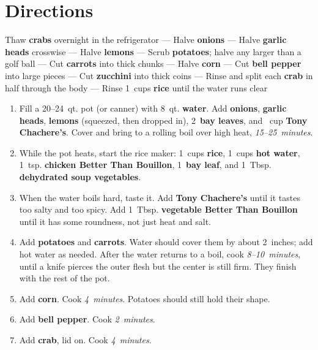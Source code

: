 \documentclass[11pt,letterpaper]{article}
\begin{document}
\section*{Directions}

\noindent
Thaw \textbf{crabs} overnight in the refrigerator ---
Halve \textbf{onions} ---
Halve \textbf{garlic heads} crosswise ---
Halve \textbf{lemons} ---
Scrub \textbf{potatoes}; halve any larger than a golf ball ---
Cut \textbf{carrots} into thick chunks ---
Halve \textbf{corn} ---
Cut \textbf{bell pepper} into large pieces ---
Cut \textbf{zucchini} into thick coins ---
Rinse and split each \textbf{crab} in half through the body ---
Rinse 1~cups \textbf{rice} until the water runs clear

\begin{enumerate}
    \item Fill a 20--24~qt. pot (or canner) with 8~qt. \textbf{water}. Add \textbf{onions}, \textbf{garlic heads}, \textbf{lemons} (squeezed, then dropped in), 2~\textbf{bay leaves}, and ~cup \textbf{Tony Chachere's}. Cover and bring to a rolling boil over high heat, \textit{15--25~minutes}.

    \item While the pot heats, start the rice maker: 1~cups \textbf{rice}, 1~cups \textbf{hot water}, 1~tsp. \textbf{chicken Better Than Bouillon}, 1~\textbf{bay leaf}, and 1~Tbsp. \textbf{dehydrated soup vegetables}.

    \item When the water boils hard, taste it. Add \textbf{Tony Chachere's} until it tastes too salty and too spicy. Add 1~Tbsp. \textbf{vegetable Better Than Bouillon} until it has some roundness, not just heat and salt.

    \item Add \textbf{potatoes} and \textbf{carrots}. Water should cover them by about 2~inches; add hot water as needed. After the water returns to a boil, cook \textit{8--10~minutes}, until a knife pierces the outer flesh but the center is still firm. They finish with the rest of the pot.

    \item Add \textbf{corn}. Cook \textit{4~minutes}. Potatoes should still hold their shape.

    \item Add \textbf{bell pepper}. Cook \textit{2~minutes}.

    \item Add \textbf{crab}, lid on. Cook \textit{4~minutes}.


\end{enumerate}
\end{document}
